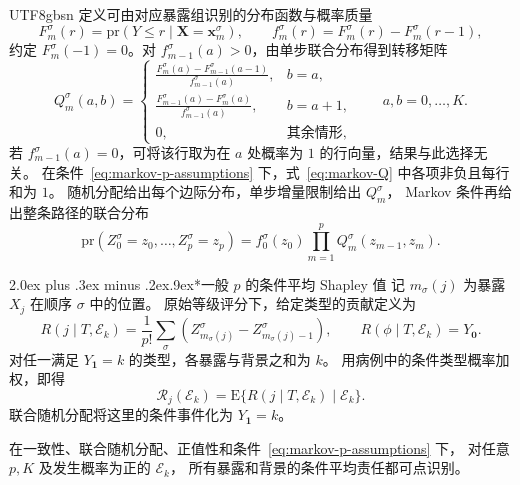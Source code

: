 \documentclass[11pt,a4paper]{article}
\makeatletter
\newcommand{\headingweight}{\ifPDFTeX\mdseries\else\bfseries\fi}
\renewcommand{\section}{\@startsection{section}{1}{0pt}
  {2.0ex plus .3ex minus .2ex}{.9ex}{\normalfont\large\headingweight}}
\makeatother
\begin{document}
\begin{CJK*}{UTF8}{gbsn}
定义可由对应暴露组识别的分布函数与概率质量
\[
F_m^\sigma(r)=\mathrm{pr}(Y\le r\mid\mathbf X=\mathbf x_m^\sigma),
\qquad
f_m^\sigma(r)=F_m^\sigma(r)-F_m^\sigma(r-1),
\]
约定 $F_m^\sigma(-1)=0$。对 $f_{m-1}^\sigma(a)>0$，由单步联合分布得到转移矩阵
\begin{equation}
Q_m^\sigma(a,b)=
\begin{cases}
\displaystyle
\frac{F_m^\sigma(a)-F_{m-1}^\sigma(a-1)}
     {f_{m-1}^\sigma(a)}, & b=a,\\[7pt]
\displaystyle
\frac{F_{m-1}^\sigma(a)-F_m^\sigma(a)}
     {f_{m-1}^\sigma(a)}, & b=a+1,\\[7pt]
0, & \text{其余情形},
\end{cases}
\qquad a,b=0,\ldots,K.
\label{eq:markov-Q}
\end{equation}
若 $f_{m-1}^\sigma(a)=0$，可将该行取为在 $a$ 处概率为 $1$ 的行向量，结果与此选择无关。
在条件~\eqref{eq:markov-p-assumptions} 下，式~\eqref{eq:markov-Q} 中各项非负且每行和为 $1$。
随机分配给出每个边际分布，单步增量限制给出 $Q_m^\sigma$，
Markov 条件再给出整条路径的联合分布
\begin{equation}
\mathrm{pr}(Z_0^\sigma=z_0,\ldots,Z_p^\sigma=z_p)
=f_0^\sigma(z_0)\prod_{m=1}^{p}Q_m^\sigma(z_{m-1},z_m).
\label{eq:markov-path}
\end{equation}

\clearpage
\section*{一般 $p$ 的条件平均 Shapley 值}
记 $m_\sigma(j)$ 为暴露 $X_j$ 在顺序 $\sigma$ 中的位置。
原始等级评分下，给定类型的贡献定义为
\begin{equation}
R(j\mid T,\mathcal E_k)
=\frac1{p!}\sum_\sigma
\left(Z_{m_\sigma(j)}^\sigma-Z_{m_\sigma(j)-1}^\sigma\right),
\qquad
R(\phi\mid T,\mathcal E_k)=Y_{\mathbf0}.
\label{eq:markov-p-shapley}
\end{equation}
对任一满足 $Y_{\mathbf1}=k$ 的类型，各暴露与背景之和为 $k$。
用病例中的条件类型概率加权，即得
\[
\mathcal R_j(\mathcal E_k)
=\mathrm E\{R(j\mid T,\mathcal E_k)\mid\mathcal E_k\}.
\]
联合随机分配将这里的条件事件化为 $Y_{\mathbf1}=k$。

\medskip
\noindent{\headingweight 命题。}
在一致性、联合随机分配、正值性和条件~\eqref{eq:markov-p-assumptions} 下，
对任意 $p,K$ 及发生概率为正的 $\mathcal E_k$，
所有暴露和背景的条件平均责任都可点识别。


\end{CJK*}
\end{document}
